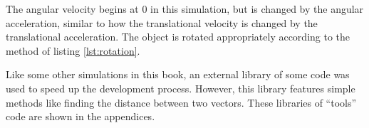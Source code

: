 The angular velocity begins at 0 in this simulation, but is changed by the angular acceleration, similar to how the translational velocity is changed by the translational acceleration.  The object is rotated appropriately according to the method of listing \ref{lst:rotation}.  

Like some other simulations in this book, an external library of some code was used to speed up the development process.  However, this library features simple methods like finding the distance between two vectors.  These libraries of ``tools'' code are shown in the appendices.  



















